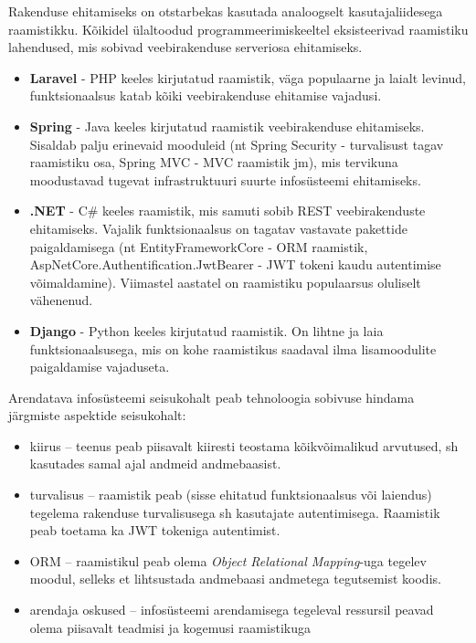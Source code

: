 Rakenduse ehitamiseks on otstarbekas kasutada analoogselt kasutajaliidesega raamistikku. Kõikidel ülaltoodud
programmeerimiskeeltel eksisteerivad raamistiku lahendused, mis sobivad veebirakenduse serveriosa ehitamiseks.

\begin{itemize}
    \item \textbf{Laravel} - PHP keeles kirjutatud raamistik, väga populaarne ja laialt levinud, funktsionaalsus 
    katab kõiki veebirakenduse ehitamise vajadusi.
    \item \textbf{Spring} - Java keeles kirjutatud raamistik veebirakenduse ehitamiseks. Sisaldab palju erinevaid 
    mooduleid (nt Spring Security - turvalisust tagav raamistiku osa, Spring MVC - MVC raamistik jm), mis 
    tervikuna moodustavad tugevat infrastruktuuri suurte infosüsteemi ehitamiseks.
    \item \textbf{.NET} - C\# keeles raamistik, mis samuti sobib REST veebirakenduste ehitamiseks. 
    Vajalik funktsionaalsus on tagatav vastavate pakettide paigaldamisega (nt EntityFrameworkCore - 
    ORM raamistik, AspNetCore.Authentification.JwtBearer - JWT tokeni kaudu autentimise võimaldamine).
    Viimastel aastatel on raamistiku populaarsus oluliselt vähenenud.
    \item \textbf{Django} - Python keeles kirjutatud raamistik. On lihtne ja laia funktsionaalsusega,
    mis on kohe raamistikus saadaval ilma lisamoodulite paigaldamise vajaduseta.
\end{itemize}

Arendatava infosüsteemi seisukohalt peab tehnoloogia sobivuse hindama järgmiste aspektide seisukohalt: 
\begin{itemize}
    \item kiirus -- teenus peab piisavalt kiiresti teostama kõikvõimalikud arvutused, sh kasutades samal
    ajal andmeid andmebaasist.
    \item turvalisus -- raamistik peab (sisse ehitatud funktsionaalsus või laiendus) tegelema
    rakenduse turvalisusega sh kasutajate autentimisega. Raamistik peab toetama ka JWT tokeniga
    autentimist.
    \item ORM -- raamistikul peab olema \textit{Object Relational Mapping}-uga tegelev moodul, 
    selleks et lihtsustada andmebaasi andmetega tegutsemist koodis.
    \item arendaja oskused -- infosüsteemi arendamisega tegeleval ressursil peavad olema piisavalt teadmisi
    ja kogemusi raamistikuga
\end{itemize} 

